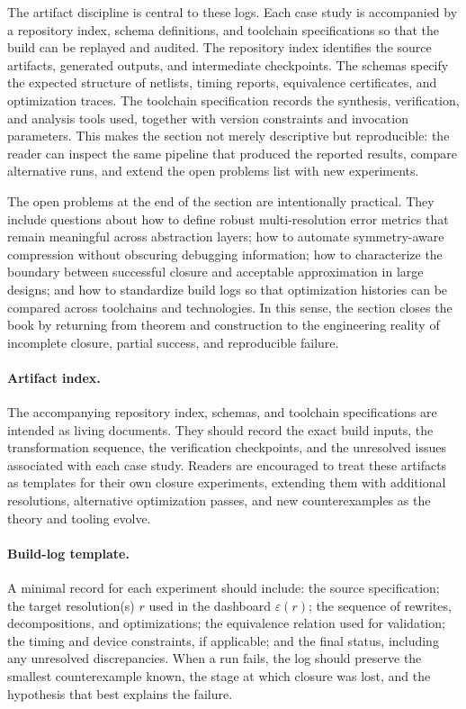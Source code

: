 \documentclass[11pt]{article}
\begin{document}
The artifact discipline is central to these logs. Each case study is accompanied by a repository index, schema definitions, and toolchain specifications so that the build can be replayed and audited. The repository index identifies the source artifacts, generated outputs, and intermediate checkpoints. The schemas specify the expected structure of netlists, timing reports, equivalence certificates, and optimization traces. The toolchain specification records the synthesis, verification, and analysis tools used, together with version constraints and invocation parameters. This makes the section not merely descriptive but reproducible: the reader can inspect the same pipeline that produced the reported results, compare alternative runs, and extend the open problems list with new experiments.

The open problems at the end of the section are intentionally practical. They include questions about how to define robust multi-resolution error metrics that remain meaningful across abstraction layers; how to automate symmetry-aware compression without obscuring debugging information; how to characterize the boundary between successful closure and acceptable approximation in large designs; and how to standardize build logs so that optimization histories can be compared across toolchains and technologies. In this sense, the section closes the book by returning from theorem and construction to the engineering reality of incomplete closure, partial success, and reproducible failure.

\paragraph{Artifact index.} The accompanying repository index, schemas, and toolchain specifications are intended as living documents. They should record the exact build inputs, the transformation sequence, the verification checkpoints, and the unresolved issues associated with each case study. Readers are encouraged to treat these artifacts as templates for their own closure experiments, extending them with additional resolutions, alternative optimization passes, and new counterexamples as the theory and tooling evolve.

\paragraph{Build-log template.} A minimal record for each experiment should include: the source specification; the target resolution(s) \(r\) used in the dashboard \(\varepsilon(r)\); the sequence of rewrites, decompositions, and optimizations; the equivalence relation used for validation; the timing and device constraints, if applicable; and the final status, including any unresolved discrepancies. When a run fails, the log should preserve the smallest counterexample known, the stage at which closure was lost, and the hypothesis that best explains the failure.
\end{document}
